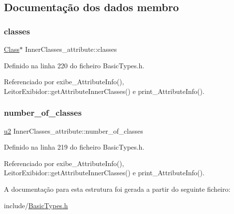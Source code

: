 \subsection{Documentação dos dados membro}
\mbox{\label{structInnerClasses__attribute_ab9d6da51f62c9886a96d40719c81b103}} 
\subsubsection{\texorpdfstring{classes}{classes}}
{\footnotesize\ttfamily \hyperlink{structClass}{Class}$\ast$ Inner\+Classes\+\_\+attribute\+::classes}



Definido na linha 220 do ficheiro Basic\+Types.\+h.



Referenciado por exibe\+\_\+\+Attribute\+Info(), Leitor\+Exibidor\+::get\+Attribute\+Inner\+Classes() e print\+\_\+\+Attribute\+Info().

\mbox{\label{structInnerClasses__attribute_ae1ab3ffc94d37479a2f58cb801674191}} 
\subsubsection{\texorpdfstring{number\+\_\+of\+\_\+classes}{number\_of\_classes}}
{\footnotesize\ttfamily \hyperlink{BasicTypes_8h_a732cde1300aafb73b0ea6c2558a7a54f}{u2} Inner\+Classes\+\_\+attribute\+::number\+\_\+of\+\_\+classes}



Definido na linha 219 do ficheiro Basic\+Types.\+h.



Referenciado por exibe\+\_\+\+Attribute\+Info(), Leitor\+Exibidor\+::get\+Attribute\+Inner\+Classes() e print\+\_\+\+Attribute\+Info().



A documentação para esta estrutura foi gerada a partir do seguinte ficheiro\+:\begin{DoxyCompactItemize}
\item 
include/\hyperlink{BasicTypes_8h}{Basic\+Types.\+h}\end{DoxyCompactItemize}
